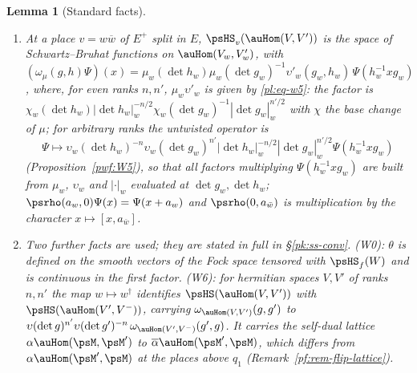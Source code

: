 \documentclass[10pt]{amsart}
\newtheorem{lemma}[theorem]{Lemma}
\theoremstyle{definition}
\theoremstyle{remark}
\providecommand{\auU}{\mathrm U}
\providecommand{\aubar}[1]{\overline{#1}}
\begin{document}
\begin{lemma}[Standard facts]
\begin{enumerate}
$g\in\auU(W)(\auA_f)$ stabilises $L$ then $\omega(g)\psvac_L=\psvac_L$.
\item[(W5)] At a place $v=w\aubar w$ of $E^+$ split in $E$, $\psHS_v(\auHom(V,V'))$ is the space
of Schwartz--Bruhat functions on $\auHom(V_w,V'_w)$, with $(\omega_\mu(g,h)\Psi)(x)=\mu_w(\det h_w)
\mu_w(\det g_w)^{-1}\upsilon'_w(g_w,h_w)\,\Psi(h_w^{-1}xg_w)$, where, for even ranks $n,n'$, $\mu_w\upsilon'_w$ is given by \eqref{pl:eq-w5}: the factor is
$\chi_w(\det h_w)|\det h_w|_w^{-n/2}\chi_w(\det g_w)^{-1}|\det g_w|_w^{n'/2}$ with $\chi$ the base
change of $\mu$; for arbitrary ranks the untwisted operator is
\[\Psi\mapsto\upsilon_w(\det h_w)^{-n}\upsilon_w(\det g_w)^{n'}|\det h_w|_w^{-n/2}|\det g_w|_w^{n'/2}\Psi(h_w^{-1}xg_w)\]
(Proposition~\ref{pwf:W5}), so that all factors multiplying $\Psi(h_w^{-1}xg_w)$ are built from $\mu_w$, $\upsilon_w$ and $|\cdot|_w$ evaluated at $\det g_w,\det h_w$; $\psrho(a_w,0)\Psi(x)=\Psi(x+a_w)$
and $\psrho(0,a_{\bar w})$ is multiplication by the character $x\mapsto[x,a_{\bar w}]$.
\item[(W0), (W6)] Two further facts are used; they are stated in full in \S\ref{pk:ss-conv}.
(W0): $\theta$ is defined on the smooth vectors of the Fock space tensored with $\psHS_f(W)$ and is
continuous in the first factor. (W6): for hermitian spaces $V,V'$ of ranks $n,n'$ the map
$w\mapsto w^\dagger$ identifies $\psHS(\auHom(V,V'))$ with $\psHS(\auHom(V',V^-))$, carrying
$\omega_{\auHom(V,V')}(g,g')$ to $\upsilon(\det g)^{n'}\upsilon(\det g')^{-n}\,
\omega_{\auHom(V',V^-)}(g',g)$. It carries the self-dual lattice $\alpha\auHom(\psM,\psM')$ to
$\aubar\alpha\auHom(\psM',\psM)$, which differs from $\alpha\auHom(\psM',\psM)$ at the places above $q_1$
(Remark~\ref{pf:rem-flip-lattice}).
\end{enumerate}
\end{lemma}
\end{document}

